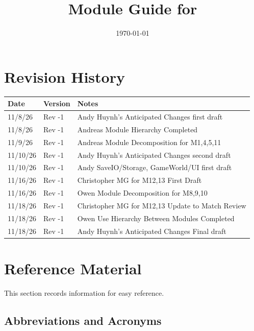 \documentclass[12pt, titlepage]{article}
\begin{document}
\title{Module Guide for \progname{}} 
\author{\authname}
\date{\today}

\maketitle


\section{Revision History}

\begin{tabularx}{\textwidth}{p{3cm}p{2cm}X}
\toprule {\bf Date} & {\bf Version} & {\bf Notes}\\
\midrule
11/8/26 & Rev -1 & Andy Huynh's Anticipated Changes first draft \\
11/8/26 & Rev -1 & Andreas Module Hierarchy Completed\\
11/9/26 & Rev -1 & Andreas Module Decomposition for M1,4,5,11\\
11/10/26 & Rev -1 & Andy Huynh's Anticipated Changes second draft \\
11/10/26 & Rev -1 & Andy SaveIO/Storage, GameWorld/UI first draft \\
11/16/26 & Rev -1 & Christopher MG for M12,13 First Draft\\
11/16/26 & Rev -1 & Owen Module Decomposition for M8,9,10\\
11/18/26 & Rev -1 & Christopher MG for M12,13 Update to Match Review\\
11/18/26 & Rev -1 & Owen Use Hierarchy Between Modules Completed\\
11/18/26 & Rev -1 & Andy Huynh's Anticipated Changes Final draft \\

\bottomrule
\end{tabularx}

\newpage

\section{Reference Material}

This section records information for easy reference. 

\subsection{Abbreviations and Acronyms}
\end{document}
